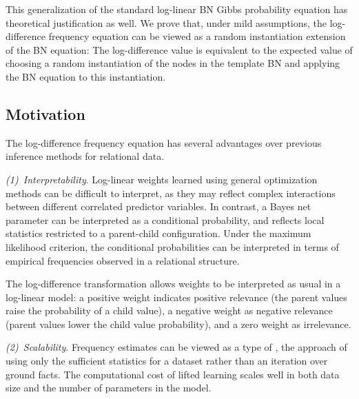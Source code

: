 \documentclass[twoside,11pt]{article}
\newcommand{\point}[1]{\noindent\emph{#1}.}
\begin{document}
This generalization of the standard log-linear BN Gibbs probability equation has theoretical justification as well. We prove that, under mild assumptions, the log-difference frequency equation can be viewed as a random instantiation extension of the BN equation: The log-difference value is equivalent to the expected value of choosing a random instantiation of the nodes in the template BN and applying the BN equation to this instantiation.

\subsection{Motivation}

The log-difference frequency equation has several advantages over previous inference methods for relational data.

\point{(1)~Interpretability} Log-linear weights learned using general optimization methods can be difficult to interpret, as they may reflect complex interactions between different correlated predictor variables. In contrast, a Bayes net parameter can be interpreted as a conditional probability, and reflects local statistics restricted to a parent-child configuration. Under the maximum likelihood criterion, the conditional probabilities can be interpreted in terms of empirical frequencies observed in a relational structure.

The log-difference transformation allows weights to be interpreted as usual in a log-linear model: a positive weight indicates positive relevance (the parent values raise the probability of a child value), a negative weight as negative relevance (parent values lower the child value probability), and a zero weight as irrelevance. 

\point{(2)~Scalability} 
Frequency estimates can be viewed as a type of  \cite{Schulte2012}, the approach of using only the sufficient statistics for a dataset rather than an iteration over ground facts. The computational cost of lifted learning scales well in both data size and the number of parameters in the model.
\end{document}
